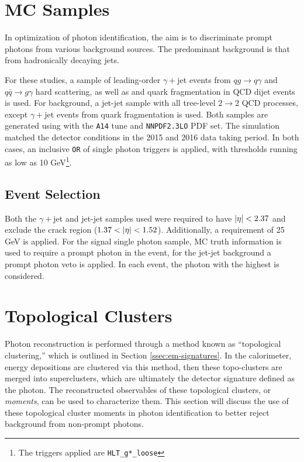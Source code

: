 \section{MC Samples} \label{sec:photon-id-samples}

In optimization of photon identification, the aim is to discriminate prompt photons from various background sources. The predominant background is that from hadronically decaying jets. 

For these studies, a sample of leading-order $\gamma+$jet events from $qg \rightarrow q \gamma$ and $q\bar{q} \rightarrow g \gamma$ hard scattering, as well as and quark fragmentation in QCD dijet events is used. For background, a jet-jet sample with all tree-level $2\rightarrow2$ QCD processes, except $\gamma+$jet events from quark fragmentation is used. Both samples are generated using \peight with the \texttt{A14} tune and \texttt{NNPDF2.3LO} PDF set. The simulation matched the detector conditions in the 2015 and 2016 data taking period. In both cases, an inclusive \texttt{OR} of single photon triggers is applied, with thresholds running as low as 10 GeV\footnote{The triggers applied are \texttt{HLT\_g*\_loose}}.

\subsection{Event Selection}

Both the $\gamma+$jet and jet-jet samples used were required to have $|\eta| < 2.37$ and exclude the crack region ($1.37<\abseta<1.52$). Additionally, a \pt requirement of 25 GeV is applied. For the signal single photon sample, \gls{MC} truth information is used to require a prompt photon in the event, for the jet-jet background a prompt photon veto is applied. In each event, the photon with the highest \pt is considered.


\section{Topological Clusters} \label{sec:topo-clusters-yid}

Photon reconstruction is performed through a method known as ``topological clustering,'' which is outlined in Section \ref{ssec:em-signatures}. In the calorimeter, energy depositions are clustered via this method, then these topo-clusters are merged into superclusters, which are ultimately the detector signature defined as the photon. The reconstructed observables of these topological clusters, or \textit{moments}, can be used to characterize them. This section will discuss the use of these topological cluster moments in photon identification to better reject background from non-prompt photons.

